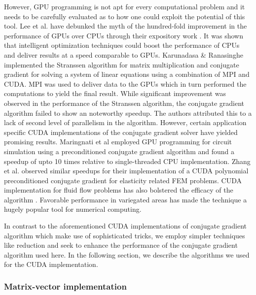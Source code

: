 \documentclass[sigplan,screen]{acmart}
\begin{document}
However, GPU programming is not apt for every computational problem and it needs to be carefully evaluated as to how one could exploit the potential of this tool. Lee et al. have debunked the myth of the hundred-fold improvement in the performance of GPUs over CPUs through their expository work  \cite{lee2010debunking}. It was shown that intelligent optimization techniques could boost the performance of CPUs and deliver results at a speed comparable to GPUs. Karunadasa \& Ranasinghe \cite{karunadasa2009accelerating} implemented the Stranssen algorithm for matrix multiplication and conjugate gradient for solving a system of linear equations using a combination of MPI and CUDA. MPI was used to deliver data to the GPUs which in turn performed the computations to yield the final result. While significant improvement was observed in the performance of the Stranssen algorithm, the conjugate gradient algorithm failed to show an noteworthy speedup. The authors attributed this to a lack of second level of parallelism in the algorithm. However, certain application specific CUDA implementations of the conjugate gradient solver have yielded promising results. Maringnati et al \cite{maringanti2009acceleration} employed GPU programming for circuit simulation using a preconditioned conjugate gradient algorithm and found a speedup of upto 10 times relative to single-threaded CPU implementation. Zhang et al. \cite{zhang2013efficient} observed similar speedups for their implementation of a CUDA polynomial preconditioned conjugate gradient for elasticity related FEM problems. CUDA implementation for fluid flow problems has also bolstered the efficacy of the algorithm \cite{ji2012cuda, amador2010cuda}. Favorable performance in variegated areas  \cite{gravvanis2012solving,phillips2014cuda, li2014gpu, michels2011sparse, oyarzun2014mpi} has made the technique a hugely popular tool for numerical computing.

In contrast to the aforementioned CUDA implementations of conjugate gradient algorithm which make use of sophisticated tricks, we employ simpler techniques like reduction and seek to enhance the performance of the conjugate gradient algorithm used here. In the following section, we describe the algorithms we used for the CUDA implementation. 

\subsubsection{Matrix-vector implementation}
\end{document}
